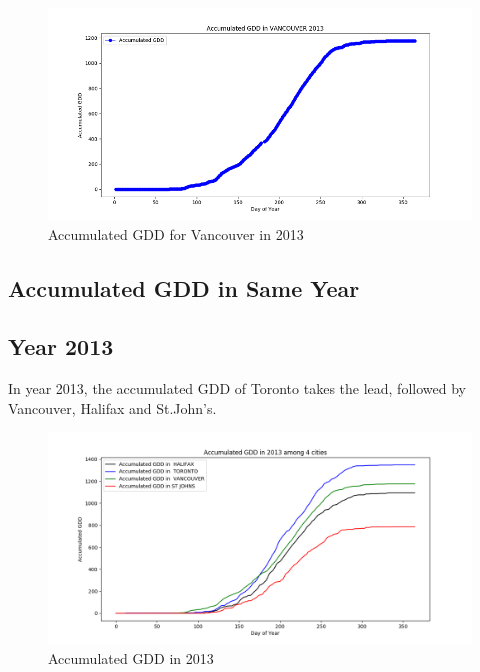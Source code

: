 \documentclass[12pt]{article}
\begin{document}
\begin{figure}[H]
\includegraphics[width=5.25in]{Plot/vancuver.png}



\caption{Accumulated GDD for Vancouver in 2013}
\label{4.4}
\end{figure}



\subsection{ \bf Accumulated GDD in Same Year  }


\subsection{Year 2013}

In year 2013, the accumulated GDD of Toronto takes the lead, followed by Vancouver, Halifax and St.John's.
\begin{figure}[H]
\includegraphics[width=5.25in]{Plot/accGDD_2013.png}



\caption{Accumulated GDD in 2013}
\label{5}
\end{figure}
\end{document}
